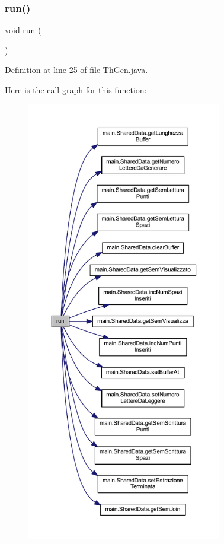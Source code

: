 \subsubsection{\texorpdfstring{run()}{run()}}
{\footnotesize\ttfamily void run (\begin{DoxyParamCaption}{ }\end{DoxyParamCaption})}



Definition at line 25 of file Th\+Gen.\+java.

Here is the call graph for this function\+:
\nopagebreak
\begin{figure}[H]
\begin{center}
\leavevmode
\includegraphics[height=550pt]{classmain_1_1_th_gen_a13a43e6d814de94978c515cb084873b1_cgraph}
\end{center}
\end{figure}


